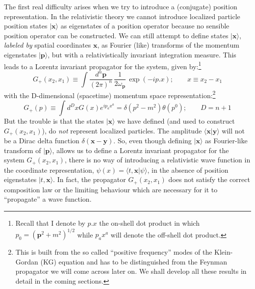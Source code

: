 \documentclass[12pt]{article}
\def\ket#1{|#1\rangle}                    %
\def\amp#1#2{\langle #1 | #2\rangle}      %
\begin{document}
  The first real difficulty arises when we try to introduce a (conjugate) position representation. In the relativistic theory we cannot introduce localized particle position states $\ket{\bm{x}}$ as eigenstates of a position operator because no sensible position operator can be constructed. We can still attempt to define states $\ket{\bm{x}}$, \textit{labeled by} spatial coordinates $\bm{x}$, as Fourier (like) transforms of the momentum eigenstates  $\ket{\bm{p}}$, but with a relativistically invariant integration measure. This leads to a Lorentz invariant propagator for the system, given by:\footnote{Recall that I denote by $p.x$ the on-shell dot product in which $p_0=(\bm{p}^2+m^2)^{1/2}$ while $p_ax^a$ will denote the off-shell dot product.} 
 \begin{equation}
G_+(x_2,x_1)\equiv \int  \frac{d^n\bm{p}}{(2\pi)^n}\,\frac{1}{2\omega_{\bm{p}}} \, \exp(- i p.x); \qquad x\equiv x_2-x_1  
\end{equation} 
with the D-dimensional (spacetime) momentum space representation:\footnote{This is built from the so called ``positive frequency'' modes of the Klein-Gordan (KG) equation and has to be distinguished from the Feynman propagator we will come across later on. We shall develop all these results in detail in the coming sections.}
\begin{equation}
 G_+(p)\equiv \int d^Dx G(x)e^{ip_ax^a}=\delta(p^2-m^2)\theta(p^0); \qquad D=n+1
\end{equation} 
 But the trouble is that the  states $\ket{\bm{x}}$ we have defined (and used to construct $G_+(x_2,x_1)$), do \textit{not} represent localized particles. The amplitude $\amp{\bm{x}}
  {\bm{y}}$ will not be a Dirac delta function $\delta(\bm{x}-\bm{y})$. So, even though defining $\ket{\bm{x}}$ as Fourier-like transform of  $\ket{\bm{p}}$, allows us to define a Lorentz invariant propagator for the system $G_+(x_2,x_1)$,  there is no way of introducing a relativistic wave function 
  in the coordinate representation,
  $\psi(x)=\amp{t,\bm{x}}{\psi}$, in the absence of position eigenstates $\ket{t,\bm{x}}$. In fact, the propagator  $G_+(x_2,x_1)$ does not satisfy the correct composition law or the limiting behaviour which are necessary for it  to ``propagate'' a wave function. 
 
\end{document}
